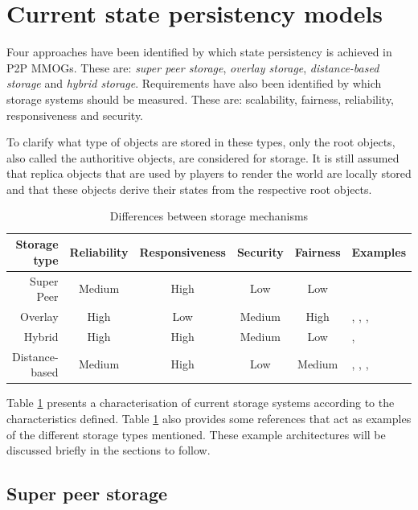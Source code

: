 \documentclass[10pt,a4paper,journal,cspaper,compsoc]{IEEEtran}
\begin{document}
\section{Current state persistency models}
\label{current_models}

Four approaches have been identified by which state persistency is achieved in P2P MMOGs. These are: \emph{super peer storage}, \emph{overlay
storage}, \emph{distance-based storage} and \emph{hybrid storage}. Requirements have also been identified by which storage systems should be
measured. These are: scalability, fairness, reliability, responsiveness and security.

To clarify what type of objects are stored in these types, only the root objects, also called the authoritive objects, are considered for storage. It
is still assumed that replica objects that are used by players to render the world are locally stored and that these objects derive their states from
the respective root objects.

\begin{table}[htbp]
\centering
\begin{tabular}{|r|c|c|c|c|l|}
\hline
Storage type & Reliability & Responsiveness & Security & Fairness & Examples\\
\hline
Super Peer & Medium & High & Low & Low & \cite{knutsson_p2p_first}\\
Overlay & High & Low & Medium & High & \cite{Douglas05enablingmassively}, \cite{using_freenet_storage},
\cite{Fan_phd}, \cite{past_storage_focus}\\
Hybrid & High & High & Medium & Low & \cite{zoned_federation}, \cite{hybrid_storage1}\\
Distance-based & Medium & High & Low & Medium & \cite{Buyukkaya_voronoi_state_management}, \cite{Hu_voronoi_IM},
\cite{colyseus_distance_based}, \cite{solipsis}\\
\hline
\end{tabular}
\caption{Differences between storage mechanisms} \label{tab_storage}
\end{table}
%
Table \ref{tab_storage} presents a characterisation of current storage systems according to the characteristics defined. Table \ref{tab_storage} also
provides some references that act as examples of the different storage types mentioned. These example architectures will be discussed briefly in the
sections to follow.

\subsection{Super peer storage}
\end{document}
